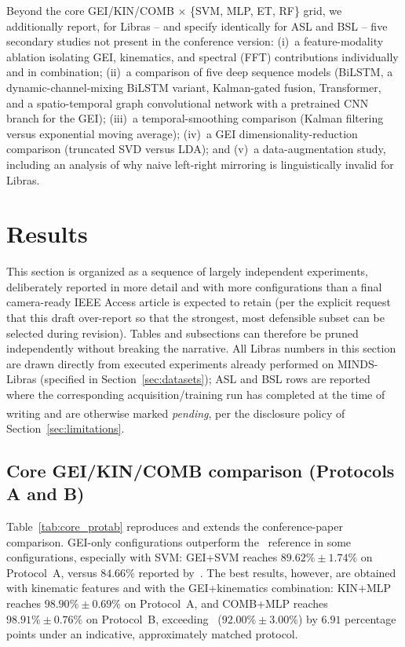 \documentclass[journal]{IEEEtran}
\newcommand{\tbd}[1]{\textit{#1}\textsuperscript{\dag}}   %
\begin{document}
Beyond the core GEI/KIN/COMB $\times$ \{SVM, MLP, ET, RF\} grid, we additionally report, for Libras -- and specify identically for ASL and BSL -- five secondary studies not present in the conference version: (i)~a feature-modality ablation isolating GEI, kinematics, and spectral (FFT) contributions individually and in combination; (ii)~a comparison of five deep sequence models (BiLSTM, a dynamic-channel-mixing BiLSTM variant, Kalman-gated fusion, Transformer, and a spatio-temporal graph convolutional network with a pretrained CNN branch for the GEI); (iii)~a temporal-smoothing comparison (Kalman filtering versus exponential moving average); (iv)~a GEI dimensionality-reduction comparison (truncated SVD versus LDA); and (v)~a data-augmentation study, including an analysis of why naive left-right mirroring is linguistically invalid for Libras.

\section{Results}
\label{sec:results}

This section is organized as a sequence of largely independent experiments, deliberately reported in more detail and with more configurations than a final camera-ready IEEE Access article is expected to retain (per the explicit request that this draft over-report so that the strongest, most defensible subset can be selected during revision). Tables and subsections can therefore be pruned independently without breaking the narrative. All Libras numbers in this section are drawn directly from executed experiments already performed on MINDS-Libras (specified in Section~\ref{sec:datasets}); ASL and BSL rows are reported where the corresponding acquisition/training run has completed at the time of writing and are otherwise marked \tbd{pending}, per the disclosure policy of Section~\ref{sec:limitations}.

\subsection{Core GEI/KIN/COMB comparison (Protocols A and B)}

Table~\ref{tab:core_protab} reproduces and extends the conference-paper comparison. GEI-only configurations outperform the~\cite{passos2021} reference in some configurations, especially with SVM: GEI+SVM reaches $89.62\%\pm1.74\%$ on Protocol~A, versus $84.66\%$ reported by~\cite{passos2021}. The best results, however, are obtained with kinematic features and with the GEI+kinematics combination: KIN+MLP reaches $98.90\%\pm0.69\%$ on Protocol~A, and COMB+MLP reaches $98.91\%\pm0.76\%$ on Protocol~B, exceeding~\cite{rego2025} ($92.00\%\pm3.00\%$) by $6.91$ percentage points under an indicative, approximately matched protocol.
\end{document}
